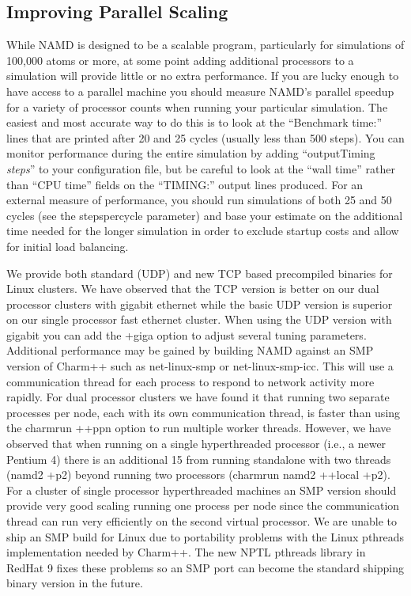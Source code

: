 \subsection{Improving Parallel Scaling}

While NAMD is designed to be a scalable program, particularly for
simulations of 100,000 atoms or more, at some point adding additional
processors to a simulation will provide little or no extra performance.
If you are lucky enough to have access to a parallel machine you should
measure NAMD's parallel speedup for a variety of processor counts when
running your particular simulation.  The easiest and most accurate way
to do this is to look at the ``Benchmark time:'' lines that are printed
after 20 and 25 cycles (usually less than 500 steps).  You can monitor
performance during the entire simulation by adding ``outputTiming {\em steps}''
to your configuration file, but be careful to look at the ``wall time''
rather than ``CPU time'' fields on the ``TIMING:'' output lines produced.
For an external measure of performance, you should run simulations of
both 25 and 50 cycles (see the stepspercycle parameter) and base your
estimate on the additional time needed for the longer simulation in
order to exclude startup costs and allow for initial load balancing.

We provide both standard (UDP) and new TCP based precompiled binaries
for Linux clusters.  We have observed that the TCP version is better
on our dual processor clusters with gigabit ethernet while the basic
UDP version is superior on our single processor fast ethernet cluster.
When using the UDP version with gigabit you can add the +giga option
to adjust several tuning parameters.  Additional performance may be
gained by building NAMD against an SMP version of Charm++ such as
net-linux-smp or net-linux-smp-icc.  This will use a communication
thread for each process to respond to network activity more rapidly.
For dual processor clusters we have found it that running two separate
processes per node, each with its own communication thread, is faster
than using the charmrun ++ppn option to run multiple worker threads.
However, we have observed that when running on a single hyperthreaded
processor (i.e., a newer Pentium 4) there is an additional 15%
from running standalone with two threads (namd2 +p2) beyond running
two processors (charmrun namd2 ++local +p2).  For a cluster of single
processor hyperthreaded machines an SMP version should provide very
good scaling running one process per node since the communication
thread can run very efficiently on the second virtual processor.  We
are unable to ship an SMP build for Linux due to portability problems
with the Linux pthreads implementation needed by Charm++.  The new
NPTL pthreads library in RedHat 9 fixes these problems so an SMP port
can become the standard shipping binary version in the future.

